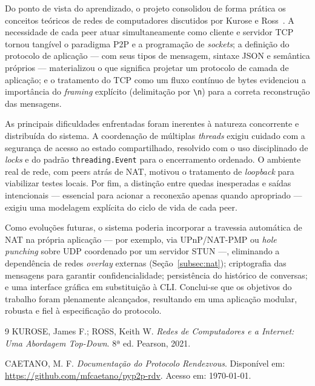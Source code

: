 \documentclass[12pt, a4paper]{article}
\begin{document}
Do ponto de vista do aprendizado, o projeto consolidou de forma prática os conceitos teóricos de redes de computadores discutidos por Kurose e Ross~\cite{kurose}. A necessidade de cada peer atuar simultaneamente como cliente e servidor TCP tornou tangível o paradigma P2P e a programação de \textit{sockets}; a definição do protocolo de aplicação --- com seus tipos de mensagem, sintaxe JSON e semântica próprios --- materializou o que significa projetar um protocolo de camada de aplicação; e o tratamento do TCP como um fluxo contínuo de bytes evidenciou a importância do \textit{framing} explícito (delimitação por \verb|\n|) para a correta reconstrução das mensagens.

As principais dificuldades enfrentadas foram inerentes à natureza concorrente e distribuída do sistema. A coordenação de múltiplas \textit{threads} exigiu cuidado com a segurança de acesso ao estado compartilhado, resolvido com o uso disciplinado de \textit{locks} e do padrão \texttt{threading.Event} para o encerramento ordenado. O ambiente real de rede, com peers atrás de NAT, motivou o tratamento de \textit{loopback} para viabilizar testes locais. Por fim, a distinção entre quedas inesperadas e saídas intencionais --- essencial para acionar a reconexão apenas quando apropriado --- exigiu uma modelagem explícita do ciclo de vida de cada peer.

Como evoluções futuras, o sistema poderia incorporar a travessia automática de NAT na própria aplicação --- por exemplo, via UPnP/NAT-PMP ou \textit{hole punching} sobre UDP coordenado por um servidor STUN ---, eliminando a dependência de redes \textit{overlay} externas (Seção~\ref{subsec:nat}); criptografia das mensagens para garantir confidencialidade; persistência do histórico de conversas; e uma interface gráfica em substituição à CLI. Conclui-se que os objetivos do trabalho foram plenamente alcançados, resultando em uma aplicação modular, robusta e fiel à especificação do protocolo.

\begin{thebibliography}{9}
KUROSE, James F.; ROSS, Keith W. 
\textit{Redes de Computadores e a Internet: Uma Abordagem Top-Down}. 
8ª ed. Pearson, 2021.

CAETANO, M. F.
\textit{Documentação do Protocolo Rendezvous}. 
Disponível em: \url{https://github.com/mfcaetano/pyp2p-rdv}. Acesso em: \today.
\end{thebibliography}
\end{document}

